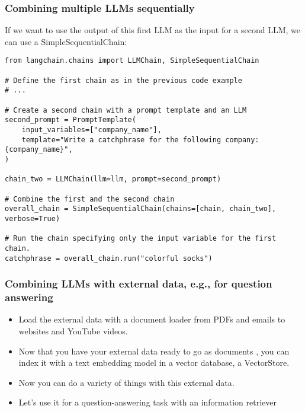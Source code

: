 \begin{frame}[fragile]\frametitle{Combining multiple LLMs sequentially}

If we want to use the output of this first LLM as the input for a second LLM, we can use a SimpleSequentialChain:

\begin{lstlisting}
from langchain.chains import LLMChain, SimpleSequentialChain

# Define the first chain as in the previous code example
# ...

# Create a second chain with a prompt template and an LLM
second_prompt = PromptTemplate(
    input_variables=["company_name"],
    template="Write a catchphrase for the following company: {company_name}",
)

chain_two = LLMChain(llm=llm, prompt=second_prompt)

# Combine the first and the second chain 
overall_chain = SimpleSequentialChain(chains=[chain, chain_two], verbose=True)

# Run the chain specifying only the input variable for the first chain.
catchphrase = overall_chain.run("colorful socks")
\end{lstlisting}


\end{frame}

\begin{frame}[fragile]\frametitle{Combining LLMs with external data, e.g., for question answering}

\begin{itemize}
\item Load the external data with a document loader from PDFs and emails to websites and YouTube videos. 
\item Now that you have your external data ready to go as documents , you can index it with a text embedding model  in a vector database, a VectorStore.  
\item Now you can do a variety of things with this external data. 
\item Let’s use it for a question-answering task with an information retriever
\end{itemize}



\end{frame}

